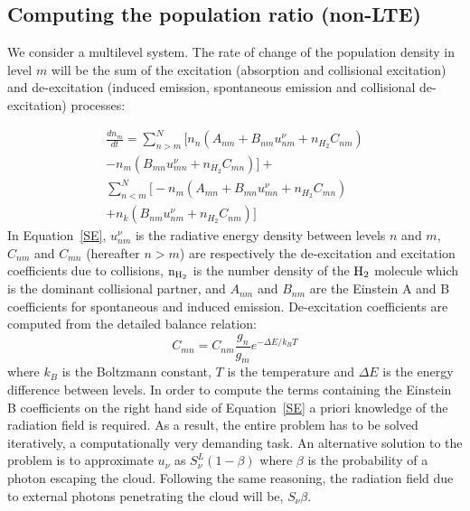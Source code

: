 \documentclass{mn2e}
\begin{document}
\subsection{Computing the population ratio (non-LTE)}\label{algdescr}

We consider a multilevel system. The rate of change of the population density in level $m$ will be the sum of the excitation (absorption and collisional excitation) and de-excitation (induced emission, spontaneous emission and collisional de-excitation) processes:

\begin{equation}\label{SE}
\begin{split}
\frac{dn_m}{dt}=\sum_{n>m}^N[n_n(A_{nm}+B_{nm}u^{\nu}_{nm}+n_{H_2}C_{nm})\\-n_m(B_{mn}u^{\nu}_{mn}+n_{H_2}C_{mn})\big]+\\
\sum_{n<m}^N\big[-n_m(A_{mn}+B_{mn}u^{\nu}_{mn}+n_{H_2}C_{mn})\\+n_k(B_{nm}u^{\nu}_{nm}+n_{H_2}C_{nm}) \big]
\end{split}
\end{equation}
In Equation~\ref{SE}, $u^{\nu}_{nm}$ is the radiative energy density between levels $n$ and $m$, $C_{nm}$ and $C_{mn}$ (hereafter $n > m$) are respectively the de-excitation and excitation coefficients due to collisions, $\rm{n_{H_2}}$ is the number density of the $\rm{H_2}$ molecule which is the dominant collisional partner, and $A_{nm}$ and $B_{nm}$ are the Einstein A and B coefficients for spontaneous and induced emission. De-excitation coefficients are computed from the detailed balance relation:
\begin{equation}\label{de_exc_exc}
C_{mn}=C_{nm}\frac{g_n}{g_m}e^{-\Delta E/k_BT}
\end{equation}
where $k_B$ is the Boltzmann constant, $T$ is the temperature and $\Delta E$ is the energy difference between levels. In order to compute the terms containing the Einstein B coefficients on the right hand side of Equation~\ref{SE} a priori knowledge of the radiation field is required. As a result, the entire problem has to be solved iteratively, a computationally very demanding task. An alternative solution to the problem is to approximate $u_\nu$ as $S_\nu^L (1-\beta)$ where $\beta$ is the probability of a photon escaping the cloud. Following the same reasoning, the radiation field due to external photons penetrating the cloud will be, $S_\nu\beta$.
\end{document}

